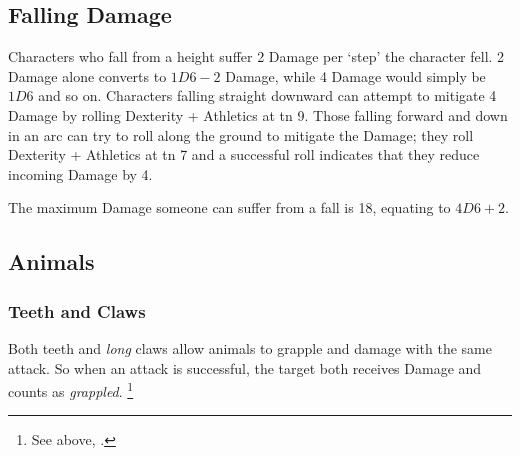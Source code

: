 \begin{multicols}{2}

\subsection[Falling Damage]{Falling Damage}

Characters who fall from a height suffer 2 Damage per `step' the character fell.
2 Damage alone converts to $1D6-2$ Damage, while 4 Damage would simply be $1D6$ and so on.
Characters falling straight downward can attempt to mitigate 4 Damage by rolling Dexterity + Athletics at \gls{tn} 9.
Those falling forward and down in an arc can try to roll along the ground to mitigate the Damage; they roll Dexterity + Athletics at \gls{tn} 7 and a successful roll indicates that they reduce incoming Damage by 4.

The maximum Damage someone can suffer from a fall is 18, equating to $4D6+2$.

\subsection{Animals}

\subsubsection{Teeth and Claws}
\label{teeth}
\label{claws}

Both teeth and \emph{long} claws allow animals to grapple and damage with the same attack.
So when an attack is successful, the target both receives Damage and counts as \textit{grappled}.%
\footnote{See above, .}

\end{multicols}
